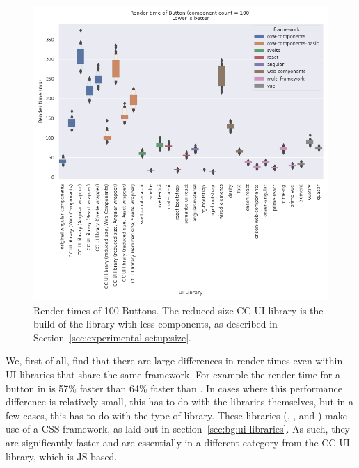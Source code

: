 \begin{figure}[h]
  \includegraphics[width=\columnwidth]{plots/render-time-all-100-Button.png}
  \caption{Render times of 100 Buttons. The reduced size CC UI library is the build of the library with less components, as described in Section~\ref{sec:experimental-setup:size}.}
  \label{fig:results:render-time-all-100}
  \centering
\end{figure}

We, first of all, find that there are large differences in render times even within UI libraries that share the same framework. For example the render time for a button in  is 57\% faster than  64\% faster than . In cases where this performance difference is relatively small, this has to do with the libraries themselves, but in a few cases, this has to do with the type of library. These libraries (, , and ) make use of a CSS framework, as laid out in section~\ref{sec:bg:ui-libraries}. As such, they are significantly faster and are essentially in a different category from the CC UI library, which is JS-based.


